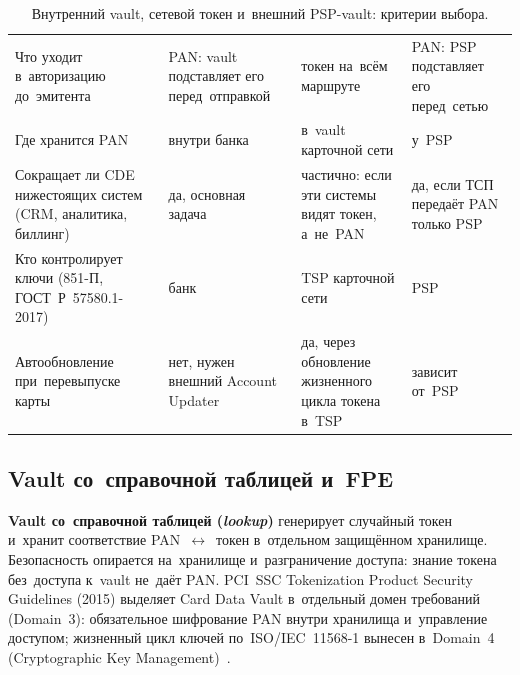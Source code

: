 \begin{table}[!b]
  \caption{Внутренний vault, сетевой токен и~внешний PSP-vault: критерии выбора.}\label{tab:token-tokenization-choice}
  \begingroup
  \tablesetup
  \begin{tabularx}{\textwidth}{
      @{}P{0.30\textwidth}
      Y Y Y@{}
    }
    \toprule
    \headrow
     &  &  &  \\
    \midrule
    Что уходит в~авторизацию до~эмитента & PAN: vault подставляет его перед~отправкой & токен на~всём маршруте & PAN: PSP подставляет его перед~сетью \\
    \rowsep
    Где хранится PAN & внутри банка & в~vault карточной сети & у~PSP \\
    \rowsep
    Сокращает ли CDE нижестоящих систем (CRM, аналитика, биллинг) & да, основная задача & частично: если эти системы видят токен, а~не~PAN & да, если ТСП передаёт PAN только PSP \\
    \rowsep
    Кто контролирует ключи (851-П, ГОСТ~Р~57580.1-2017) & банк & TSP карточной сети & PSP \\
    \rowsep
    Автообновление при~перевыпуске карты & нет, нужен внешний Account Updater & да, через обновление жизненного цикла токена в~TSP & зависит от~PSP \\
    \bottomrule
  \end{tabularx}\par
  \endgroup
\end{table}

\subsection*{Vault со~справочной таблицей и~FPE}

\textbf{Vault со~справочной таблицей (\textit{lookup})} генерирует случайный
токен и~хранит соответствие PAN~$\leftrightarrow$~токен в~отдельном защищённом
хранилище. Безопасность опирается на~хранилище и~разграничение доступа: знание
токена без~доступа к~vault не~даёт PAN. PCI~SSC Tokenization Product Security
Guidelines (2015) выделяет Card Data Vault в~отдельный домен требований
(Domain~3): обязательное шифрование PAN внутри хранилища и~управление
доступом; жизненный цикл ключей по~ISO/IEC~11568-1 вынесен в~Domain~4
(Cryptographic Key Management)~\cite{pci-token-product-security-2015}.

